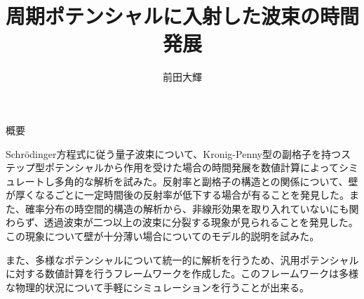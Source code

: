 \documentclass[a4paper, lualatex]{bxjsarticle}
\title{周期ポテンシャルに入射した波束の時間発展}
\author{前田大輝}
\begin{document}
\maketitle
\tableofcontents
\begin{section}{概要}
    \par Schrödinger方程式に従う量子波束について、Kronig-Penny型の副格子を持つステップ型ポテンシャルから作用を受けた場合の時間発展を数値計算によってシミュレートし多角的な解析を試みた。反射率と副格子の構造との関係について、壁が厚くなるごとに一定時間後の反射率が低下する場合が有ることを発見した。また、確率分布の時空間的構造の解析から、非線形効果を取り入れていないにも関わらず、透過波束が二つ以上の波束に分裂する現象が見られることを発見した。この現象について壁が十分薄い場合についてのモデル的説明を試みた。
    \par また、多様なポテンシャルについて統一的に解析を行うため、汎用ポテンシャルに対する数値計算を行うフレームワークを作成した。このフレームワークは多様な物理的状況について手軽にシミュレーションを行うことが出来る。
\end{section}
\end{document}
